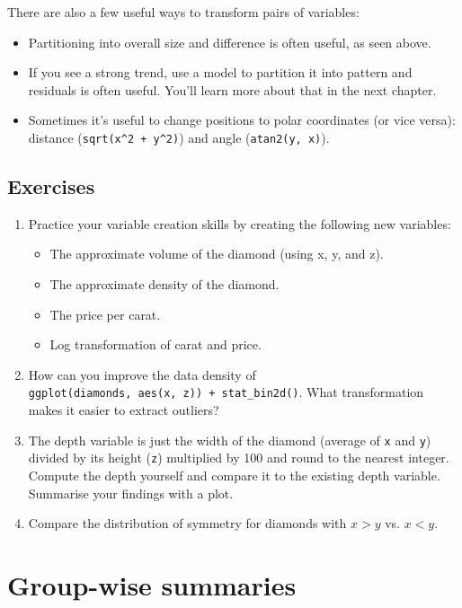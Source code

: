 There are also a few useful ways to transform pairs of variables:

\begin{itemize}
\item
  Partitioning into overall size and difference is often useful, as seen
  above.
\item
  If you see a strong trend, use a model to partition it into pattern
  and residuals is often useful. You'll learn more about that in the
  next chapter.
\item
  Sometimes it's useful to change positions to polar coordinates (or
  vice versa): distance (\texttt{sqrt(x\^{}2\ +\ y\^{}2)}) and angle
  (\texttt{atan2(y,\ x)}).
\end{itemize}

\subsection{Exercises}

\begin{enumerate}
\def\labelenumi{\arabic{enumi}.}
\item
  Practice your variable creation skills by creating the following new
  variables:

  \begin{itemize}
  \tightlist
  \item
    The approximate volume of the diamond (using x, y, and z).
  \item
    The approximate density of the diamond.
  \item
    The price per carat.
  \item
    Log transformation of carat and price.
  \end{itemize}
\item
  How can you improve the data density of
  \texttt{ggplot(diamonds,\ aes(x,\ z))\ +\ stat\_bin2d()}. What
  transformation makes it easier to extract outliers?
\item
  The depth variable is just the width of the diamond (average of
  \texttt{x} and \texttt{y}) divided by its height (\texttt{z})
  multiplied by 100 and round to the nearest integer. Compute the depth
  yourself and compare it to the existing depth variable. Summarise your
  findings with a plot.
\item
  Compare the distribution of symmetry for diamonds with \(x > y\) vs.
  \(x < y\).
\end{enumerate}

\section{Group-wise summaries}\label{sec:summarise}


